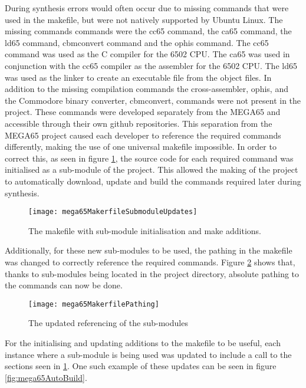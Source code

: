 During synthesis errors would often occur due to missing commands that were used in the makefile, but were not natively supported by Ubuntu Linux. The missing commands commands were the cc65 command, the ca65 command, the ld65 command, cbmconvert command and the ophis command. The cc65 command was used as the C compiler for the 6502 CPU. The ca65 was used in conjunction with the cc65 compiler as the assembler for the 6502 CPU. The ld65 was used as the linker to create an executable file from the object files. In addition to the missing compilation commands the cross-assembler, ophis, and the Commodore binary converter, cbmconvert, commands were not present in the project. These commands were developed separately from the MEGA65 and accessible through their own github repositories. This separation from the MEGA65 project caused each developer to reference the required commands differently, making the use of one universal makefile impossible. In order to correct this, as seen in figure \ref{fig:mega65MakerfileSubmodulesUpdates}, the source code for each required command was initialised as a sub-module of the project. This allowed the making of the project to automatically download, update and build the commands required later during synthesis.\\

\begin{figure}
  \centering
  \texttt{[image: mega65MakerfileSubmoduleUpdates]}
  \caption{The makefile with sub-module initialisation and make additions.}
  \label{fig:mega65MakerfileSubmodulesUpdates}
\end{figure}

Additionally, for these new sub-modules to be used, the pathing in the makefile was changed to correctly reference the required commands. Figure \ref{fig:mega65MakerfilePathing} shows that, thanks to sub-modules being located in the project directory, absolute pathing to the commands can now be done.\\

\begin{figure}
  \centering
  \texttt{[image: mega65MakerfilePathing]}
  \caption{The updated referencing of the sub-modules}
  \label{fig:mega65MakerfilePathing}
\end{figure}

For the initialising and updating additions to the makefile to be useful, each instance where a sub-module is being used was updated to include a call to the sections seen in \ref{fig:mega65MakerfileSubmodulesUpdates}. One such example of these updates can be seen in figure \ref{fig:mega65AutoBuild}.\\

